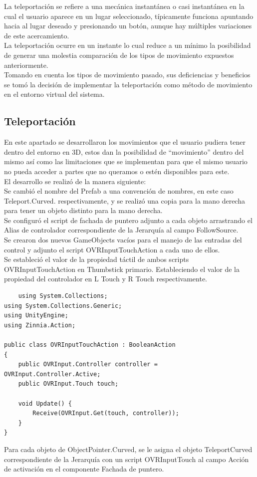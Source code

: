 La teleportación se refiere a una mecánica instantánea o casi instantánea en la cual el usuario aparece en un lugar seleccionado, típicamente funciona apuntando hacia al 
lugar deseado y presionando un botón, aunque hay múltiples variaciones de este acercamiento.\\
La teleportación ocurre en un instante lo cual reduce a un mínimo la posibilidad de generar una molestia comparación de los tipos de movimiento expuestos anteriormente.\\
Tomando en cuenta los tipos de movimiento pasado, sus deficiencias y beneficios se tomó la decisión de implementar la teleportación como método de movimiento en el entorno 
virtual del sistema.\\

\subsection{Teleportación}
En este apartado se desarrollaron los movimientos que el usuario pudiera tener dentro del entorno en 3D, estos dan la posibilidad de “movimiento” dentro del mismo así 
como las limitaciones que se implementan para que el mismo usuario no pueda acceder a partes que no queramos o estén disponibles para este.\\
El desarrollo se realizó de la manera siguiente:\\ 
Se cambió el nombre del Prefab a una convención de nombres, en este caso Teleport.Curved. respectivamente, y se realizó una copia para la mano derecha para tener 
un objeto distinto para la mano derecha.\\
Se configuró el script de fachada de puntero adjunto a cada objeto arrastrando el Alias de controlador correspondiente de la Jerarquía al campo FollowSource.\\
Se crearon dos nuevos GameObjects vacíos para el manejo de las entradas del control y adjunto el script OVRInputTouchAction a cada uno de ellos.\\
Se estableció el valor de la propiedad táctil de ambos scripts OVRInputTouchAction en Thumbstick primario. Estableciendo el valor de la propiedad del controlador en L Touch
 y R Touch respectivamente.\\

\begin{verbatim}
    using System.Collections;
using System.Collections.Generic;
using UnityEngine;
using Zinnia.Action;
 
public class OVRInputTouchAction : BooleanAction
{
    public OVRInput.Controller controller = OVRInput.Controller.Active;
    public OVRInput.Touch touch;
 
    void Update() {
        Receive(OVRInput.Get(touch, controller));
    }
}
\end{verbatim}
Para cada objeto de ObjectPointer.Curved, se le asigna el objeto TeleportCurved correspondiente de la Jerarquía con un script OVRInputTouch al campo Acción de activación en el componente Fachada de puntero.\\

